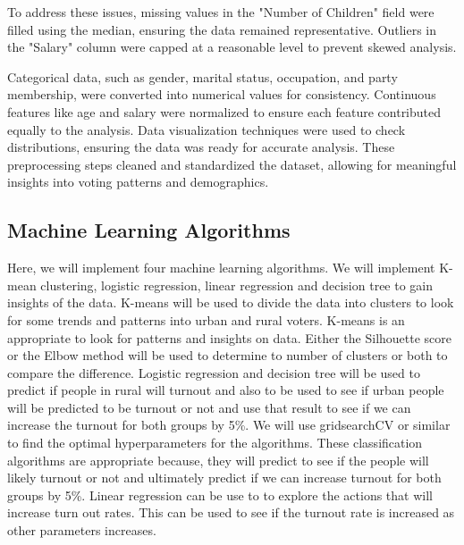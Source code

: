 \documentclass[conference]{IEEEtran}
\begin{document}
To address these issues, missing values in the "Number of Children" field were filled using the median, ensuring the data remained representative. Outliers in the "Salary" column were capped at a reasonable level to prevent skewed analysis.

Categorical data, such as gender, marital status, occupation, and party membership, were converted into numerical values for consistency. Continuous features like age and salary were normalized to ensure each feature contributed equally to the analysis. Data visualization techniques were used to check distributions, ensuring the data was ready for accurate analysis. These preprocessing steps cleaned and standardized the dataset, allowing for meaningful insights into voting patterns and demographics.



\subsection{Machine Learning Algorithms}

Here, we will implement four machine learning algorithms. We will implement K-mean clustering, logistic regression, linear regression and decision tree to gain insights of the data. K-means will be used to divide the data into clusters to look for some trends and patterns into urban and rural voters. K-means is an appropriate to look for patterns and insights on data. Either the Silhouette score or the Elbow method will be used to determine to number of clusters or both to compare the difference.
Logistic regression and decision tree will be used to predict if people in rural will turnout and also to be used to see if urban people will be predicted to be turnout or not and use that result to see if we can increase the turnout for both groups by 5\%. We will use gridsearchCV or similar to find the optimal hyperparameters for the algorithms. These classification algorithms are appropriate because, they will predict to see if the people will likely turnout or not and ultimately predict if we can increase turnout for both groups by 5\%. Linear regression can be use to to explore the actions that will increase turn out rates. This can be used to see if the turnout rate is increased as other parameters increases.
\end{document}

